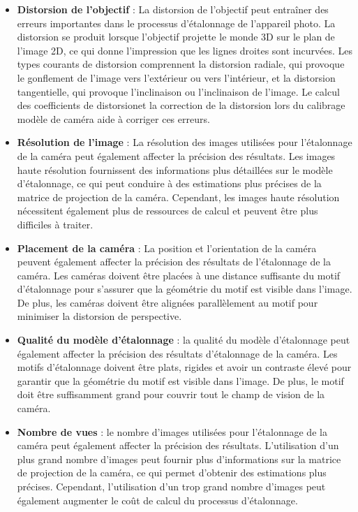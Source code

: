 \begin{itemize}
	\item \textbf{Distorsion de l’objectif } :  La distorsion de l’objectif peut entraîner des erreurs importantes dans le processus d’étalonnage de l’appareil photo. La distorsion se produit lorsque l’objectif projette le monde 3D sur le plan de l’image 2D, ce qui donne l’impression que les lignes droites sont incurvées. Les types courants de distorsion comprennent la distorsion radiale, qui provoque le gonflement de l’image vers l’extérieur ou vers l’intérieur, et la distorsion tangentielle, qui provoque l’inclinaison ou l’inclinaison de l’image. Le calcul des coefficients de distorsionet la correction de la distorsion lors du calibrage modèle de caméra aide à corriger ces erreurs. \\
	
	\item \textbf{Résolution de l’image} : La résolution des images utilisées pour l’étalonnage de la caméra peut également affecter la précision des résultats. Les images haute résolution fournissent des informations plus détaillées sur le modèle d’étalonnage, ce qui peut conduire à des estimations plus précises de la matrice de projection de la caméra. Cependant, les images haute résolution nécessitent également plus de ressources de calcul et peuvent être plus difficiles à traiter.
	\\
	
	\item \textbf{Placement de la caméra} : La position et l’orientation de la caméra peuvent également affecter la précision des résultats de l’étalonnage de la caméra. Les caméras doivent être placées à une distance suffisante du motif d’étalonnage pour s’assurer que la géométrie du motif est visible dans l’image. De plus, les caméras doivent être alignées parallèlement au motif pour minimiser la distorsion de perspective. \\
	
	\item \textbf{Qualité du modèle d’étalonnage} : la qualité du modèle d’étalonnage peut également affecter la précision des résultats d’étalonnage de la caméra. Les motifs d’étalonnage doivent être plats, rigides et avoir un contraste élevé pour garantir que la géométrie du motif est visible dans l’image. De plus, le motif doit être suffisamment grand pour couvrir tout le champ de vision de la caméra.
	\\
	
	\item \textbf{Nombre de vues} :  le nombre d’images utilisées pour l’étalonnage de la caméra peut également affecter la précision des résultats. L’utilisation d’un plus grand nombre d’images peut fournir plus d’informations sur la matrice de projection de la caméra, ce qui permet d’obtenir des estimations plus précises. Cependant, l’utilisation d’un trop grand nombre d’images peut également augmenter le coût de calcul du processus d’étalonnage. \\
	

\end{itemize}
